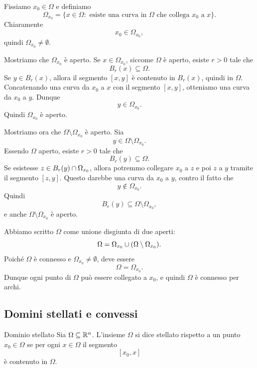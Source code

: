\documentclass[a4paper]{article}
\begin{document}
\begin{snippetproof}{}
    Fissiamo \(x_0\in\Omega\) e definiamo
    \[
        \Omega_{x_0}
        =
        \{x\in\Omega:\text{ esiste una curva in }\Omega\text{ che collega }x_0\text{ a }x\}.
    \]
    Chiaramente
    \[
        x_0\in\Omega_{x_0},
    \]
    quindi \(\Omega_{x_0}\neq\emptyset\).

    Mostriamo che \(\Omega_{x_0}\) è aperto. Se \(x\in\Omega_{x_0}\), siccome \(\Omega\) è aperto, esiste \(r>0\) tale che
    \[
        B_r(x)\subseteq\Omega.
    \]
    Se \(y\in B_r(x)\), allora il segmento \([x,y]\) è contenuto in \(B_r(x)\), quindi in \(\Omega\). Concatenando una curva da \(x_0\) a \(x\) con il segmento \([x,y]\), otteniamo una curva da \(x_0\) a \(y\). Dunque
    \[
        y\in\Omega_{x_0}.
    \]
    Quindi \(\Omega_{x_0}\) è aperto.

    Mostriamo ora che \(\Omega\setminus\Omega_{x_0}\) è aperto. Sia
    \[
        y\in\Omega\setminus\Omega_{x_0}.
    \]
    Essendo \(\Omega\) aperto, esiste \(r>0\) tale che
    \[
        B_r(y)\subseteq\Omega.
    \]
    Se esistesse \(z\in B_r(y)\cap\Omega_{x_0}\), allora potremmo collegare \(x_0\) a \(z\) e poi \(z\) a \(y\) tramite il segmento \([z,y]\). Questo darebbe una curva da \(x_0\) a \(y\), contro il fatto che
    \[
        y\notin\Omega_{x_0}.
    \]
    Quindi
    \[
        B_r(y)\subseteq\Omega\setminus\Omega_{x_0},
    \]
    e anche \(\Omega\setminus\Omega_{x_0}\) è aperto.

    Abbiamo scritto \(\Omega\) come unione disgiunta di due aperti:
    \[
        \Omega=\Omega_{x_0}\cup(\Omega\setminus\Omega_{x_0}).
    \]
    Poiché \(\Omega\) è connesso e \(\Omega_{x_0}\neq\emptyset\), deve essere
    \[
        \Omega=\Omega_{x_0}.
    \]
    Dunque ogni punto di \(\Omega\) può essere collegato a \(x_0\), e quindi \(\Omega\) è connesso per archi.
\end{snippetproof}

\subsection{Domini stellati e convessi}

\begin{snippetdefinition}{Dominio stellato}
    Sia \(\Omega\subseteq\mathbb{R}^n\). L'insieme \(\Omega\) si dice stellato rispetto a un punto \(x_0\in\Omega\) se per ogni \(x\in\Omega\) il segmento
    \[
        [x_0,x]
    \]
    è contenuto in \(\Omega\).
\end{snippetdefinition}
\end{document}
